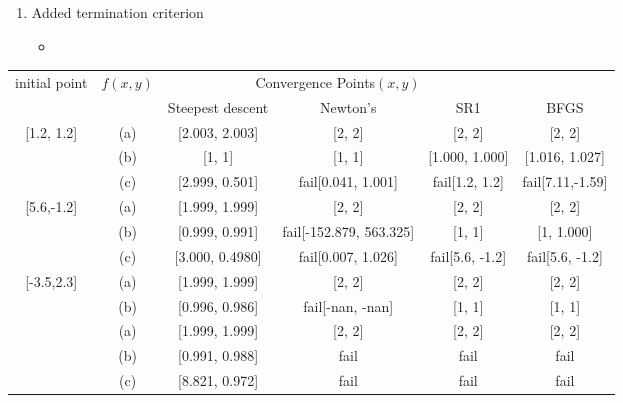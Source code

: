 \documentclass[../main.tex]{subfiles}
\begin{document}
\begin{enumerate}
    \item Added termination criterion
    \begin{itemize}
        \item
    \end{itemize}
\end{enumerate}
    
\begin{center}
    \begin{tabular}{| c | c | c | c | c | c | } \hline
    \multirow{2}{*}{initial point}  & \multirow{2}{*}{$f(x, y)$}   & \multicolumn{3}{c|}{Convergence Points$(x, y)$} \\ \cline{3-5}
                                    &                              & Steepest descent & Newton's & SR1 & BFGS \\ \hline
    \multirow{3}{*}{[1.2, 1.2]}     & (a)                          & [2.003, 2.003]   & [2, 2] & [2, 2] & [2, 2]  \\ 
                                    & (b)                          & [1, 1]           & [1, 1]& [1.000, 1.000] & [1.016, 1.027] \\ 
                                    & (c)                          & [2.999, 0.501]   & fail[0.041, 1.001] & fail[1.2, 1.2] & fail[7.11,-1.59]\\ \hline
    \multirow{3}{*}{[5.6,-1.2]}     & (a)                          & [1.999, 1.999]   & [2, 2] & [2, 2] & [2, 2] \\ 
                                    & (b)                          & [0.999, 0.991]   & fail[-152.879, 563.325] & [1, 1] & [1, 1.000] \\ 
                                    & (c)                          & [3.000, 0.4980]  & fail[0.007, 1.026] & fail[5.6, -1.2] & fail[5.6, -1.2] \\ \hline
    \multirow{3}{*}{[-3.5,2.3]}     & (a)                          & [1.999, 1.999]   & [2, 2] & [2, 2] & [2, 2] \\ 
                                    & (b)                          & [0.996, 0.986]   & fail[-nan, -nan] & [1, 1] & [1, 1] \\ 
    \multirow{3}{*}{[10.5,-8.3]}    & (a)                          & [1.999, 1.999]   & [2, 2] & [2, 2] & [2, 2] \\ 
                                    & (b)                          & [0.991, 0.988]   & fail & fail & fail \\ 
                                    & (c)                          & [8.821, 0.972]   & fail & fail & fail \\ \hline
                                    
    \end{tabular}
\end{center}
\end{document}

